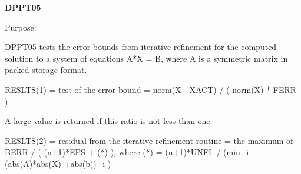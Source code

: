 {\bfseries D\+P\+P\+T05} 

\begin{DoxyParagraph}{Purpose\+: }
\begin{DoxyVerb} DPPT05 tests the error bounds from iterative refinement for the
 computed solution to a system of equations A*X = B, where A is a
 symmetric matrix in packed storage format.

 RESLTS(1) = test of the error bound
           = norm(X - XACT) / ( norm(X) * FERR )

 A large value is returned if this ratio is not less than one.

 RESLTS(2) = residual from the iterative refinement routine
           = the maximum of BERR / ( (n+1)*EPS + (*) ), where
             (*) = (n+1)*UNFL / (min_i (abs(A)*abs(X) +abs(b))_i )\end{DoxyVerb}
 
\end{DoxyParagraph}

